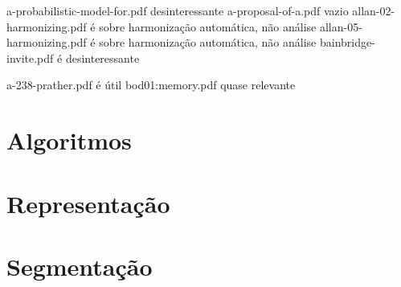 a-probabilistic-model-for.pdf desinteressante
a-proposal-of-a.pdf vazio
allan-02-harmonizing.pdf é sobre harmonização automática, não análise
allan-05-harmonizing.pdf é sobre harmonização automática, não análise
bainbridge-invite.pdf é desinteressante




a-238-prather.pdf é útil
bod01:memory.pdf quase relevante


\section{Algoritmos}



\section{Representação}


\section{Segmentação}

